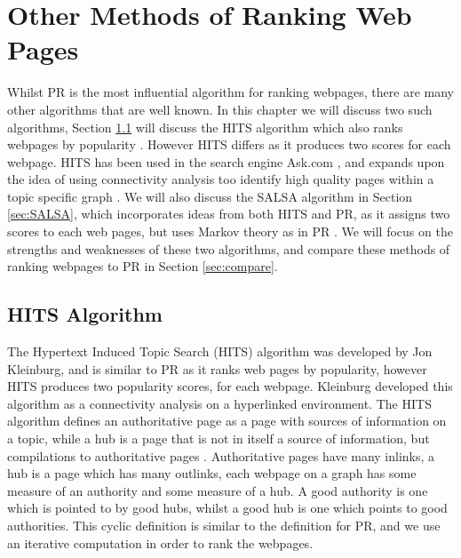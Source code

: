\documentclass[11pt]{report}
\begin{document}
\chapter{Other Methods of Ranking Web Pages}\label{chap:Other}


Whilst PR is the most influential algorithm for ranking webpages, there are many other algorithms that are well known. In this chapter we will discuss two such algorithms, Section \ref{sec:HITS} will discuss the HITS algorithm which also ranks webpages by popularity \cite{kleinberg1999authoritative}. However HITS differs as it produces two scores for each webpage. HITS has been used in the search engine Ask.com \cite{bonato}, and expands upon the idea of using connectivity analysis too identify high quality pages within a topic specific graph \cite{manning}. We will also discuss the SALSA algorithm in Section \ref{sec:SALSA}, which incorporates ideas from both HITS and PR, as it assigns two scores to each web pages, but uses Markov theory as in PR \cite{lempel2000stochastic}. We will focus on the strengths and weaknesses of these two algorithms, and compare these methods of ranking webpages to PR in Section \ref{sec:compare}.

\section{HITS Algorithm} \label{sec:HITS}
The Hypertext Induced Topic Search (HITS) algorithm was developed by Jon Kleinburg, and is similar to PR as it ranks web pages by popularity, however HITS produces two popularity scores, for each webpage.  Kleinburg developed this algorithm as a connectivity analysis on a hyperlinked environment. The HITS algorithm defines an authoritative page as a page with sources of information on a topic, while a hub is a page that is not in itself a source of information, but compilations to authoritative pages \cite{manning}. Authoritative pages have many inlinks, a hub is a page which has many outlinks, each webpage on a graph has some measure of an authority and some measure of a hub. A good authority is one which is pointed to by good hubs, whilst a good hub is one which points to good authorities. This cyclic definition is similar to the definition for PR, and we use an iterative computation in order to rank the webpages.
\end{document}
